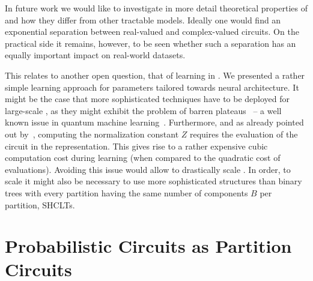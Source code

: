 In future work we would like to investigate in more detail theoretical properties of \pocs and how they differ from other tractable models. Ideally one would find an exponential separation between real-valued and complex-valued circuits. On the practical side it remains, however, to be seen whether such a separation has an equally important impact on real-world datasets.

This relates to another open question,  that of learning in \pocs. We presented a rather simple learning approach for parameters tailored towards neural architecture. It might be the case that more sophisticated techniques have to be deployed for large-scale \pocs, as they might exhibit the problem of barren plateaus~\citep{ragone2023unified} -- a well known issue in quantum machine learning~\citep{biamonte2017quantum,huggins2019towards}.
Furthermore, and as already pointed out by~\citet{loconte2024subtractive}, computing the normalization constant $Z$ requires the evaluation of the circuit in the \poc representation. This gives rise to a rather expensive cubic computation cost during learning (when compared to the quadratic cost of \pvc evaluations). Avoiding this issue would allow to drastically scale \pvcs. In order, to scale \pvcs it might also be necessary to use more sophisticated structures than binary trees with every partition having the same number of components $B$ per partition, \cf SHCLTs.



\clearpage














\newpage

\setcounter{equation}{0}
\renewcommand{\theequation}{A\arabic{equation}}

\appendix








\section{Probabilistic Circuits as Partition Circuits}
\label{sec:lpc}


